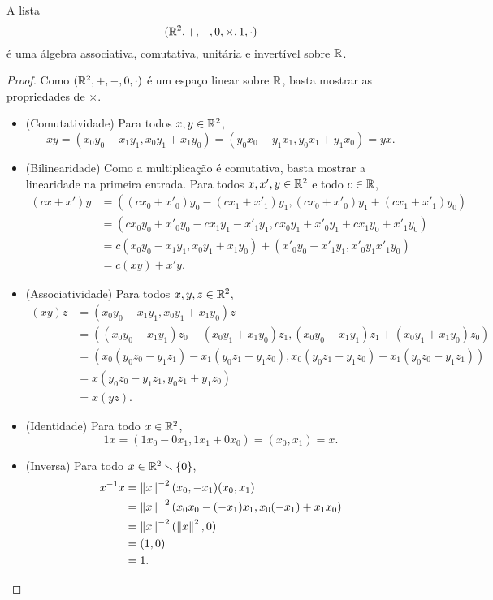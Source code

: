 \begin{proposition}
A lista
	\begin{equation*}
	(\mathbb{R}^2,+,-,0,\times,1,\cdot)
	\end{equation*}
é uma álgebra associativa, comutativa, unitária e invertível sobre $\mathbb{R}$.
\end{proposition}
\begin{proof}
Como $(\mathbb{R}^2,+,-,0,\cdot)$ é um espaço linear sobre $\mathbb{R}$, basta mostrar as propriedades de $\times$.
\begin{itemize}
	\item (Comutatividade) Para todos $x,y \in \mathbb{R}^2$,
		\begin{equation*}
		xy = (x_0y_0-x_1y_1,x_0y_1+x_1y_0) = (y_0x_0-y_1x_1,y_0x_1+y_1x_0) = yx.
		\end{equation*}
	\item (Bilinearidade) Como a multiplicação é comutativa, basta mostrar a linearidade na primeira entrada. Para todos $x,x',y \in \mathbb{R}^2$ e todo $c \in \mathbb{R}$,
		\begin{align*}
		(cx+x')y &= ((cx_0+x'_0)y_0-(cx_1+x'_1)y_1,(cx_0+x'_0)y_1+(cx_1+x'_1)y_0) \\
			&= (cx_0y_0+x'_0y_0-cx_1y_1-x'_1y_1,cx_0y_1+x'_0y_1+cx_1y_0+x'_1y_0) \\
			&= c(x_0y_0-x_1y_1,x_0y_1+x_1y_0) + (x'_0y_0-x'_1y_1,x'_0y_1x'_1y_0) \\
			&= c(xy) + x'y.
		\end{align*}
	\item (Associatividade) Para todos $x,y,z \in \mathbb{R}^2$,
		\begin{align*}
		(xy)z &= (x_0y_0-x_1y_1,x_0y_1+x_1y_0)z \\
			&= ((x_0y_0-x_1y_1)z_0 - (x_0y_1+x_1y_0)z_1 , (x_0y_0-x_1y_1)z_1 + (x_0y_1+x_1y_0)z_0 ) \\
			&= (x_0(y_0z_0-y_1z_1)-x_1(y_0z_1+y_1z_0),x_0(y_0z_1+y_1z_0)+x_1(y_0z_0-y_1z_1)) \\
			&= x(y_0z_0-y_1z_1,y_0z_1+y_1z_0) \\
			&= x(yz).
		\end{align*}
	\item (Identidade) Para todo $x \in \mathbb{R}^2$,
		\begin{equation*}
		1x = (1x_0-0x_1,1x_1+0x_0) = (x_0,x_1) = x.
		\end{equation*}
	\item (Inversa) Para todo $x \in \mathbb{R}^2 \smallsetminus \{0\}$,
		\begin{align*}
		x^{-1} x &= \left\Vert{x}\right\Vert^{-2}(x_0,-x_1)(x_0,x_1) \\
			&= \left\Vert{x}\right\Vert^{-2} (x_0x_0 - (-x_1)x_1,x_0(-x_1)+x_1x_0) \\
			&= \left\Vert{x}\right\Vert^{-2} (\left\Vert{x}\right\Vert^2,0) \\
			&= (1,0) \\
			&= 1.
			\qedhere
		\end{align*}
\end{itemize}
\end{proof}

